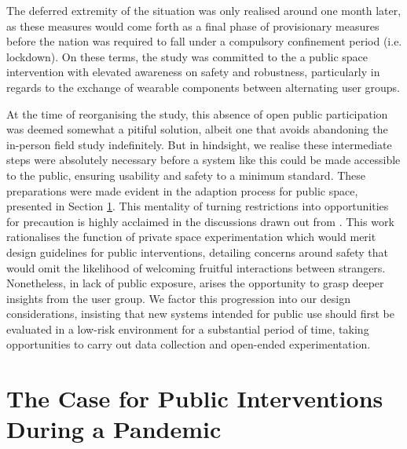 The deferred extremity of the situation was only realised around one month later, as these measures would come forth as a final phase of provisionary measures before the nation was required to fall under a compulsory confinement period (i.e. lockdown). On these terms, the study was committed to the a public space intervention with elevated awareness on safety and robustness, particularly in regards to the exchange of wearable components between alternating user groups. 

At the time of reorganising the study, this absence of open public participation was deemed somewhat a pitiful solution, albeit one that avoids abandoning the in-person field study indefinitely. But in hindsight, we realise these intermediate steps were absolutely necessary before a system like this could be made accessible to the public, ensuring usability and safety to a minimum standard. These preparations were made evident in the adaption process for public space, presented in Section \ref{sec:public_adaptation}. This mentality of turning restrictions into opportunities for precaution is highly acclaimed in the discussions drawn out from \cite{howell_life-affirming_2019}. This work rationalises the function of private space experimentation which would merit design guidelines for public interventions, detailing concerns around safety that would omit the likelihood of welcoming fruitful interactions between strangers. Nonetheless, in lack of public exposure, arises the opportunity to grasp deeper insights from the user group. We factor this progression into our design considerations, insisting that new systems intended for public use should first be evaluated in a low-risk environment for a substantial period of time, taking opportunities to carry out data collection and open-ended experimentation.

\section{The Case for Public Interventions During a Pandemic}
\label{sec:public_adaptation}


